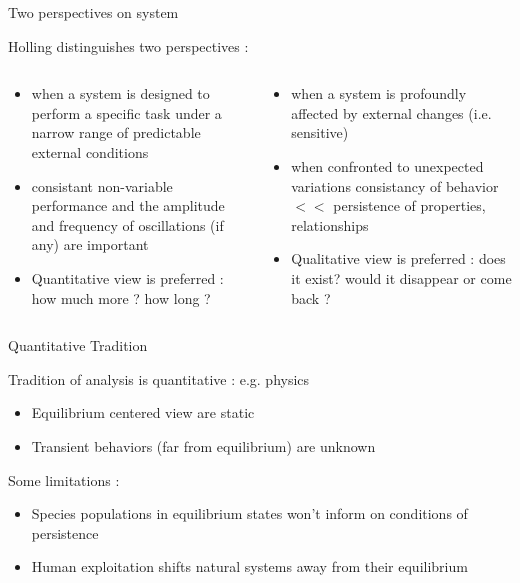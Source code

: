 \documentclass[11,aspectratio=1610]{beamer}
\begin{document}
\begin{frame}{Two perspectives on system}

Holling distinguishes two perspectives : 

\vspace{1cm}

\begin{scriptsize}
\begin{columns}
          \begin{column}{0.5\textwidth}
\begin{itemize}
\item when a system is designed to perform a specific task \alert{under a narrow range of predictable external conditions}
\item \alert{consistant non-variable performance} and the amplitude and frequency of oscillations (if any) are important
\item \alert{Quantitative} view is preferred : how much more ? how long ? 
\end{itemize}      
\end{column}
\vrule
\begin{column}{0.5\textwidth}
\begin{itemize}
\item when a system is profoundly affected by external changes  (i.e.  sensitive)
\item when confronted to \alert{unexpected variations} consistancy of behavior $<<$ \alert{persistence of properties, relationships}
\item \alert{Qualitative} view is preferred : does it exist?  would it disappear  or come back ?
\end{itemize}
\end{column}
\end{columns}
\end{scriptsize}

\end{frame}




\begin{frame}{Quantitative Tradition}


Tradition of analysis is \alert{quantitative} : e.g. physics 

  \vfill

\begin{itemize}
  \item  Equilibrium centered view are static  
  \item  Transient behaviors  (far from equilibrium) are unknown
  \end{itemize}
  \vfill
  Some limitations : 
  \begin{itemize}
  \item  Species populations in equilibrium states won't inform on conditions of persistence 
  \item  Human exploitation shifts natural systems away from their equilibrium
\end{itemize}
\end{frame}
  
\end{document}
